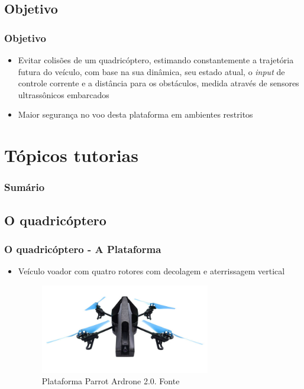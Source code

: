 \documentclass{beamer}
\begin{document}
\subsection*{Objetivo}

\begin{frame}
	\frametitle{Objetivo}	
	
	\begin{itemize}
		\item Evitar colisões de um quadricóptero, estimando constantemente a trajetória futura do veículo, com base na sua dinâmica, seu estado atual, o \textit{input} de controle corrente e a distância para os obstáculos, medida através de sensores ultrassônicos embarcados
		 
		
		 
		 \item Maior segurança no voo desta plataforma em ambientes restritos
	\end{itemize} 
	 	
\end{frame}


\section{Tópicos tutorias}

\begin{frame}
	\frametitle{Sumário}
	\tableofcontents[currentsection]
\end{frame}

\subsection*{O quadricóptero}
\begin{frame}
  	
	\frametitle{O quadricóptero - A Plataforma}
	
	\begin{itemize}
	
	\item Veículo voador com quatro rotores com decolagem e aterrissagem vertical \cite{Salih2010}
		
	\begin{figure}
		\centering
		\includegraphics[keepaspectratio = true,
		width=0.7\textwidth]{img/parrot_drone.jpg}
		\caption{Plataforma Parrot Ardrone 2.0. Fonte \cite{ardrone}}
		\label{fig:quad}
	\end{figure}
		
	\end{itemize}
	
\end{frame}
\end{document}
